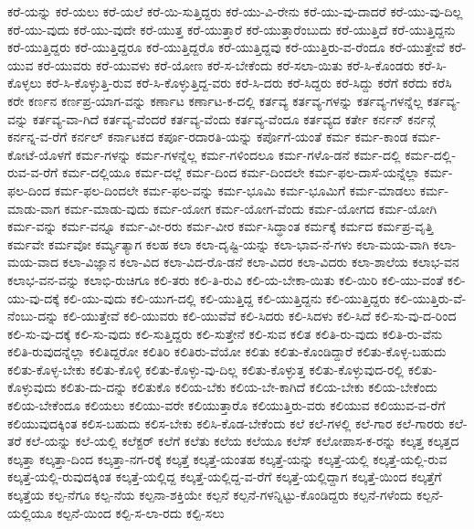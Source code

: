 {ಕರೆ-ಯನ್ನು
ಕರೆ-ಯಲು
ಕರೆ-ಯಲೆ
ಕರೆ-ಯಿ-ಸುತ್ತಿದ್ದರು
ಕರೆ-ಯು-ವಿ-ರೇನು
ಕರೆ-ಯು-ವು-ದಾದರೆ
ಕರೆ-ಯು-ವು-ದಿಲ್ಲ
ಕರೆ-ಯು-ವುದು
ಕರೆ-ಯು-ವುದೇ
ಕರೆ-ಯುತ್ತ
ಕರೆ-ಯುತ್ತಾರೆ
ಕರೆ-ಯುತ್ತಾರೆಂಬುದು
ಕರೆ-ಯುತ್ತಿದೆ
ಕರೆ-ಯುತ್ತಿದ್ದನು
ಕರೆ-ಯುತ್ತಿದ್ದರು
ಕರೆ-ಯುತ್ತಿದ್ದರೂ
ಕರೆ-ಯುತ್ತಿದ್ದರೊ
ಕರೆ-ಯುತ್ತಿದ್ದವು
ಕರೆ-ಯುತ್ತಿರು-ವ-ರೆಂದೂ
ಕರೆ-ಯುತ್ತೇವೆ
ಕರೆ-ಯುವ
ಕರೆ-ಯುವರು
ಕರೆ-ಯುವಳು
ಕರೆ-ಯೋಣ
ಕರೆ-ಸ-ಬೇಕೆಂದು
ಕರೆ-ಸಲಾ-ಯಿತು
ಕರೆ-ಸಿ-ಕೊಂಡರು
ಕರೆ-ಸಿ-ಕೊಳ್ಳಲು
ಕರೆ-ಸಿ-ಕೊಳ್ಳುತ್ತಿ-ರುವ
ಕರೆ-ಸಿ-ಕೊಳ್ಳುತ್ತಿದ್ದ-ವರು
ಕರೆ-ಸಿ-ದರು
ಕರೆ-ಸಿದ್ದರು
ಕರೆ-ಸಿದ್ದು
ಕರೆಗೆ
ಕರೆದು
ಕರೆಸಿ
ಕರೇ
ಕರ್ಣನ
ಕರ್ಣಪ್ರ-ಯಾಗ-ವನ್ನು
ಕರ್ಣಾಟ
ಕರ್ಣಾಟ-ಕ-ದಲ್ಲಿ
ಕರ್ತವ್ಯ
ಕರ್ತವ್ಯ-ಗಳನ್ನು
ಕರ್ತವ್ಯ-ಗಳನ್ನೆಲ್ಲ
ಕರ್ತವ್ಯ-ವನ್ನು
ಕರ್ತವ್ಯ-ವಾ-ಗಿದೆ
ಕರ್ತವ್ಯ-ವೆಂದರೆ
ಕರ್ತವ್ಯ-ವೆಂದು
ಕರ್ತವ್ಯ-ವೆಂದೂ
ಕರ್ತವ್ಯದ
ಕರ್ತೇ
ಕರ್ನನ್
ಕರ್ನನ್ಗೆ
ಕರ್ನನ್ನ-ವ-ರೆಗೆ
ಕರ್ನಲ್
ಕರ್ನಾಟಕದ
ಕರ್ಪೂ-ರದಾರತಿ-ಯನ್ನು
ಕರ್ಪೊಗೆ-ಯಂತೆ
ಕರ್ಮ
ಕರ್ಮ-ಕಾಂಡ
ಕರ್ಮ-ಕೋಟೆ-ಯೊಳಗೆ
ಕರ್ಮ-ಗಳನ್ನು
ಕರ್ಮ-ಗಳನ್ನೆಲ್ಲ
ಕರ್ಮ-ಗಳಿಂದಲೂ
ಕರ್ಮ-ಗಳೊ-ಡನೆ
ಕರ್ಮ-ದಲ್ಲಿ
ಕರ್ಮ-ದಲ್ಲಿ-ರುವ-ವ-ರೆಗೆ
ಕರ್ಮ-ದಲ್ಲಿಯೂ
ಕರ್ಮ-ದಲ್ಲೆ
ಕರ್ಮ-ದಿಂದ
ಕರ್ಮ-ದಿಂದಲೇ
ಕರ್ಮ-ಫಲ-ದಾಸೆ-ಯನ್ನೆಲ್ಲಾ
ಕರ್ಮ-ಫಲ-ದಿಂದ
ಕರ್ಮ-ಫಲ-ದಿಂದಲೇ
ಕರ್ಮ-ಫಲ-ವನ್ನು
ಕರ್ಮ-ಭೂಮಿ
ಕರ್ಮ-ಭೂಮಿಗೆ
ಕರ್ಮ-ಮಾಡಲು
ಕರ್ಮ-ಮಾಡು-ವಾಗ
ಕರ್ಮ-ಮಾಡು-ವುದು
ಕರ್ಮ-ಯೋಗ
ಕರ್ಮ-ಯೋಗ-ವೆಂದು
ಕರ್ಮ-ಯೋಗದ
ಕರ್ಮ-ಯೋಗಿ
ಕರ್ಮ-ವನ್ನು
ಕರ್ಮ-ವನ್ನೂ
ಕರ್ಮ-ವೀ-ರರು
ಕರ್ಮ-ವೀರ
ಕರ್ಮ-ಸಿದ್ಧಾಂತ
ಕರ್ಮಕ್ಕೆ
ಕರ್ಮದ
ಕರ್ಮಪ್ರ-ವೃತ್ತಿ
ಕರ್ಮವೇ
ಕರ್ಮವೋ
ಕರ್ಮ್ಯತ್ಯಾಗ
ಕಲಹ
ಕಲಾ
ಕಲಾ-ದೃಷ್ಟಿ-ಯನ್ನು
ಕಲಾ-ಭಾವ-ನೆ-ಗಳು
ಕಲಾ-ಮಯ-ವಾಗಿ
ಕಲಾ-ಮಯ-ವಾದ
ಕಲಾ-ವಿಜ್ಞಾನ
ಕಲಾ-ವಿದ
ಕಲಾ-ವಿದ-ರೊ-ಡನೆ
ಕಲಾ-ವಿದರ
ಕಲಾ-ವಿದರು
ಕಲಾ-ಶಾಲೆಯ
ಕಲಾಭ-ವನ
ಕಲಾಭ-ವನ-ವನ್ನು
ಕಲಾಭಿ-ರುಚಿಗೂ
ಕಲಿ-ತರು
ಕಲಿ-ತಿ-ರುವಿ
ಕಲಿ-ಯ-ಬೇಕಾ-ಯಿತು
ಕಲಿ-ಯಿರಿ
ಕಲಿ-ಯು-ವಂತೆ
ಕಲಿ-ಯು-ವು-ದಕ್ಕೆ
ಕಲಿ-ಯು-ವುದು
ಕಲಿ-ಯುಗ-ದಲ್ಲಿ
ಕಲಿ-ಯುತ್ತಿದ್ದ
ಕಲಿ-ಯುತ್ತಿದ್ದನು
ಕಲಿ-ಯುತ್ತಿದ್ದರು
ಕಲಿ-ಯುತ್ತಿರು-ವೆ-ನೆಂಬು-ದನ್ನು
ಕಲಿ-ಯುತ್ತೇವೆ
ಕಲಿ-ಯುವರು
ಕಲಿ-ಯುವೆವೆ
ಕಲಿ-ಸಿದರು
ಕಲಿ-ಸಿದಳು
ಕಲಿ-ಸಿದೆ
ಕಲಿ-ಸು-ವು-ದ-ರಿಂದ
ಕಲಿ-ಸು-ವು-ದಕ್ಕೆ
ಕಲಿ-ಸು-ವುದು
ಕಲಿ-ಸುತ್ತಿದ್ದರು
ಕಲಿ-ಸುತ್ತೇನೆ
ಕಲಿ-ಸುವ
ಕಲಿತ
ಕಲಿತಿ-ರು-ವುದು
ಕಲಿತಿ-ರು-ವೆನು
ಕಲಿತಿ-ರುವುದನ್ನೆಲ್ಲಾ
ಕಲಿತಿದ್ದರೋ
ಕಲಿತಿರಿ
ಕಲಿತಿರು-ವೆಯೋ
ಕಲಿತು
ಕಲಿತು-ಕೊಂಡಿದ್ದಾರೆ
ಕಲಿತು-ಕೊಳ್ಳ-ಬಹುದು
ಕಲಿತು-ಕೊಳ್ಳ-ಬೇಕು
ಕಲಿತು-ಕೊಳ್ಳಿ
ಕಲಿತು-ಕೊಳ್ಳು-ವು-ದಿಲ್ಲ
ಕಲಿತು-ಕೊಳ್ಳುತ್ತ
ಕಲಿತು-ಕೊಳ್ಳುವುದ-ರಲ್ಲಿ
ಕಲಿತು-ಕೊಳ್ಳುವುದು
ಕಲಿತು-ದು-ದನ್ನು
ಕಲಿತುಕೊ
ಕಲಿಯ-ಬೆಕು
ಕಲಿಯ-ಬೇ-ಕಾಗಿದೆ
ಕಲಿಯ-ಬೇಕು
ಕಲಿಯ-ಬೇಕೆಂದು
ಕಲಿಯ-ಬೇಕೆಂದೂ
ಕಲಿಯಲು
ಕಲಿಯು-ವರೇ
ಕಲಿಯುತ್ತಾರೊ
ಕಲಿಯುತ್ತಿರು-ವರು
ಕಲಿಯುವ
ಕಲಿಯುವ-ವ-ರೆಗೆ
ಕಲಿಯುವುದಕ್ಕಿಂತ
ಕಲಿಸ-ಬಹುದು
ಕಲಿಸ-ಬೇಕು
ಕಲಿಸಿ-ಕೊಡ-ಬೇಕೆಂದು
ಕಲೆ
ಕಲೆ-ಗಳಲ್ಲಿ
ಕಲೆ-ಗಾರ
ಕಲೆ-ಗಾರರು
ಕಲೆ-ತರೆ
ಕಲೆ-ಯನ್ನು
ಕಲೆ-ಯಲ್ಲಿ
ಕಲೆಕ್ಟರ್
ಕಲೆಗೆ
ಕಲೆತು
ಕಲೆಯ
ಕಲೆಯೂ
ಕಲೆಸ್
ಕಲೋಪಾಸ-ಕ-ರನ್ನು
ಕಲ್ಕತ್ತ
ಕಲ್ಕತ್ತದ
ಕಲ್ಕತ್ತಾ
ಕಲ್ಕತ್ತಾ-ದಿಂದ
ಕಲ್ಕತ್ತಾ-ನಗ-ರಕ್ಕೆ
ಕಲ್ಕತ್ತೆ
ಕಲ್ಕತ್ತೆ-ಯಂತಹ
ಕಲ್ಕತ್ತೆ-ಯನ್ನು
ಕಲ್ಕತ್ತೆ-ಯಲ್ಲಿ
ಕಲ್ಕತ್ತೆ-ಯಲ್ಲಿ-ರುವ
ಕಲ್ಕತ್ತೆ-ಯಲ್ಲಿ-ರುವುದಕ್ಕಿಂತ
ಕಲ್ಕತ್ತೆ-ಯಲ್ಲಿದ್ದ
ಕಲ್ಕತ್ತೆ-ಯಲ್ಲಿದ್ದ-ವ-ರೆಗೆ
ಕಲ್ಕತ್ತೆ-ಯಲ್ಲಿದ್ದಾಗ
ಕಲ್ಕತ್ತೆ-ಯಿಂದ
ಕಲ್ಕತ್ತೆಗೆ
ಕಲ್ಕತ್ತೆಯ
ಕಲ್ಪ-ನೆಗೂ
ಕಲ್ಪ-ನೆಯ
ಕಲ್ಪನಾ-ಶಕ್ತಿಯೇ
ಕಲ್ಪನೆ
ಕಲ್ಪನೆ-ಗಳನ್ನಿಟ್ಟು-ಕೊಂಡಿದ್ದರು
ಕಲ್ಪನೆ-ಗಳೆಂದು
ಕಲ್ಪನೆ-ಯಲ್ಲಿಯೂ
ಕಲ್ಪನೆ-ಯಿಂದ
ಕಲ್ಪಿ-ಸ-ಲಾ-ರದು
ಕಲ್ಪಿ-ಸಲು
}
